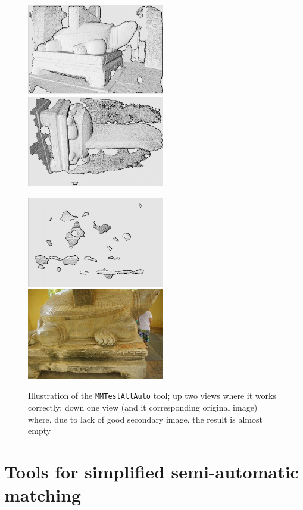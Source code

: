 \begin{figure}
\begin{center}
\includegraphics[width=60mm]{FIGS/Tortue/Dep1.jpg}
\includegraphics[width=60mm]{FIGS/Tortue/Dep2.jpg}

\includegraphics[width=60mm]{FIGS/Tortue/Dep3.jpg}
\includegraphics[width=60mm]{FIGS/Tortue/RIMGP6900.JPG}
\end{center}
\caption{Illustration of the {\tt MMTestAllAuto} tool; up two views where it works correctly;
down one view (and it corresponding original image) where, due to lack of good secondary image,
the result is almost empty}
\label{FIG:Tortue:AllAuto}
\end{figure}


\section{Tools for simplified semi-automatic matching}

